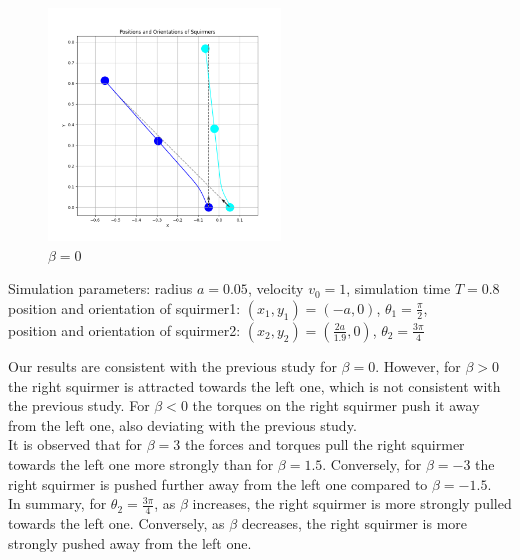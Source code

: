 \documentclass{article}
\begin{document}
\begin{figure}[H]
    \centering
    \includegraphics[width=0.55\textwidth]{graphs/simulations/sim_sq_sq/beta0/3pi_4_.png}
    \caption{\footnotesize $\beta = 0$}
\end{figure}
\begin{center}
    Simulation parameters: radius $a=0.05$, velocity $v_0=1$, simulation time $T=0.8$\\
        position and orientation of squirmer1: $(x_1,y_1)=(-a,0)$, $\theta_1=\frac{\pi}{2}$,\\
        position and orientation of squirmer2: $(x_2,y_2)=(\frac{2a}{1.9},0)$, $\theta_2=\frac{3\pi}{4}$
\end{center}
Our results are consistent with the previous study\cite{Stark} for $\beta = 0$. However, for $\beta > 0$ the right 
squirmer is attracted towards the left one,
 which is not consistent with the previous study. For $\beta < 0$ the torques on the right squirmer push
it away from the left one, also deviating with the previous study.\\
It is observed that for $\beta = 3$ the forces and torques pull the right squirmer towards the left one more strongly than for $\beta=1.5$.
Conversely, for $\beta = -3$ the right squirmer is pushed further away from the left one compared to $\beta = -1.5$.\\
In summary, for $\theta_2 = \frac{3\pi}{4}$, as $\beta$ increases, the right squirmer is more strongly pulled towards the left one. Conversely, as
$\beta$ decreases, the right squirmer is more strongly pushed away from the left one.
\end{document}
